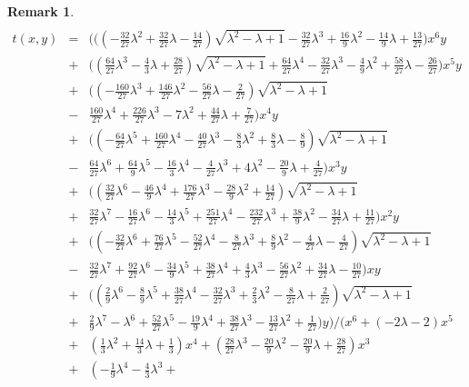 \documentclass[a4paper, 11pt]{article}
\newtheorem{rem}[defn]{Remark}
\theoremstyle{plain}
\newcommand{\?}{\textcolor{red}{??}}
\newcommand{\lm}{\lambda}
\begin{document}
\begin{rem}
{\begin{eqnarray*}
   \end{eqnarray*}
}
\footnotesize{
   \begin{eqnarray*}
    t(x,y)&=&\Biggl(\biggl(\left(-\frac{32}{27} {\lm} ^2 + \frac{32}{27} {\lm}  - \frac{14}{27}\right) \sqrt{{ {\lm} }^2- {\lm} +1} - \frac{32}{27} {\lm} ^3 + \frac{16}{9} {\lm} ^2 - \frac{14}{9} {\lm}  + \frac{13}{27}\biggr)x^6y \\ &+& \biggl(\left(\frac{64}{27} {\lm} ^3 - \frac{4}{3} {\lm}  + \frac{28}{27}\right) \sqrt{{ {\lm} }^2- {\lm} +1} + \frac{64}{27} {\lm} ^4 - \frac{32}{27} {\lm} ^3 - \frac{4}{9} {\lm} ^2 + \frac{58}{27} {\lm}  - \frac{26}{27}\biggr)x^5y \\ &+& \biggl(\left(-\frac{160}{27} {\lm} ^3 + \frac{146}{27} {\lm} ^2 - \frac{56}{27} {\lm}  - \frac{2}{27}\right) \sqrt{{ {\lm} }^2 - {\lm} +1} \\ & -& \frac{160}{27} {\lm} ^4 + \frac{226}{27} {\lm} ^3 - 7 {\lm} ^2 + \frac{44}{27} {\lm}  + \frac{7}{27}\biggr)x^4y \\ &+& \biggl(\left(-\frac{64}{27} {\lm} ^5 +\frac{160}{27} {\lm} ^4 - \frac{40}{27} {\lm} ^3 - \frac{8}{3} {\lm} ^2  + \frac{8}{3} {\lm}  - \frac{8}{9}\right) \sqrt{{ {\lm} }^2- {\lm} +1} \\ & -& \frac{64}{27} {\lm} ^6 + \frac{64}{9} {\lm} ^5 - \frac{16}{3} {\lm} ^4 - \frac{4}{27} {\lm} ^3 + 4 {\lm} ^2 - \frac{20}{9} {\lm}  + \frac{4}{27}\biggr)x^3y \\ & +& \biggl(\left(\frac{32}{27} {\lm} ^6 - \frac{46}{9} {\lm} ^4 + \frac{176}{27} {\lm} ^3 - \frac{28}{9} {\lm} ^2 + \frac{14}{27}\right) \sqrt{{ {\lm} }^2- {\lm} +1}  \\ &+& \frac{32}{27} {\lm} ^7 - \frac{16}{27} {\lm} ^6 - \frac{14}{3} {\lm} ^5 +\frac{251}{27} {\lm} ^4 - \frac{232}{27} {\lm} ^3 + \frac{38}{9} {\lm} ^2- \frac{34}{27} {\lm}  + \frac{11}{27}\biggr)x^2y \\ &+& \biggl(\left(-\frac{32}{27} {\lm} ^6+ \frac{76}{27} {\lm} ^5 - \frac{52}{27} {\lm} ^4 - \frac{8}{27} {\lm} ^3 + \frac{8}{9} {\lm} ^2  - \frac{4}{27} {\lm}  - \frac{4}{27}\right) \sqrt{{ {\lm} }^2- {\lm} +1}\\& -& \frac{32}{27} {\lm} ^7 + \frac{92}{27} {\lm} ^6 - \frac{34}{9} {\lm} ^5 + \frac{38}{27} {\lm} ^4 + \frac{4}{3} {\lm} ^3 - \frac{56}{27} {\lm} ^2 + \frac{34}{27} {\lm}  - \frac{10}{27}\biggr)xy \\ &+& \biggl(\left(\frac{2}{9} {\lm} ^6 - \frac{8}{9} {\lm} ^5 + \frac{38}{27} {\lm} ^4 - \frac{32}{27} {\lm} ^3 + \frac{2}{3} {\lm} ^2 - \frac{8}{27} {\lm} + \frac{2}{27}\right) \sqrt{{ {\lm} }^2- {\lm} +1} \\& + &\frac{2}{9} {\lm} ^7 -  {\lm} ^6 + \frac{52}{27} {\lm} ^5  - \frac{19}{9} {\lm} ^4 + \frac{38}{27} {\lm} ^3 - \frac{13}{27} {\lm} ^2 +\frac{1}{27}\biggr)y\Biggr)\Bigg/ \Biggl(x^6 + \left(-2 {\lm}  - 2\right)x^5\\ &+& \left(\frac{1}{3} {\lm} ^2 + \frac{14}{3} {\lm}  + \frac{1}{3}\right)x^4 + \left(\frac{28}{27} {\lm} ^3 - \frac{20}{9} {\lm} ^2 -\frac{20}{9} {\lm}  + \frac{28}{27} \right)x^3 \\ & +& \left(-\frac{1}{9} {\lm} ^4 - \frac{4}{3} {\lm} ^3 + 
\end{eqnarray*}}
\end{rem}
\end{document}
